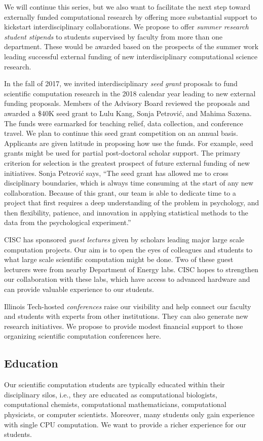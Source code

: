 \documentclass[12pt]{amsart}
\begin{document}
We will continue this series, but we also want to facilitate the next step toward externally funded computational research by offering more substantial support to kickstart interdisciplinary collaborations.  We propose to offer \emph{summer research student stipends} to students supervised by faculty from more than one department.  These would be awarded based on the prospects of the summer work leading successful external funding of new interdisciplinary computational science research. 

In the fall of 2017, we invited interdisciplinary \emph{seed grant} proposals to fund scientific computation research in the 2018 calendar year leading to new external funding proposals.  Members of the Advisory Board reviewed the proposals and awarded a \$40K seed grant to Lulu Kang, Sonja Petrovi\'c, and Mahima Saxena. The funds were earmarked for teaching relief, data collection, and conference travel.  We plan to continue this seed grant competition on an annual basis.  Applicants are given latitude in proposing how use the funds.  For example, seed grants might be used for partial post-doctoral scholar support.  The primary criterion for selection is the greatest prospect of future external funding of new initiatives. Sonja Petrovi\'c says, ``The seed grant has allowed me to cross disciplinary boundaries, which is always time consuming at the start of any new collaboration.  Because of this grant, our team is able to dedicate time to a project that first requires a deep understanding of the problem in psychology, and then flexibility, patience, and innovation in applying statistical methods to the data from the psychological experiment.''

CISC has sponsored \emph{guest lectures} given by scholars leading major large scale computation projects. Our aim is to open the eyes of colleagues and students to what large scale scientific computation might be done.  Two of these guest lecturers were from nearby Department of Energy labs.  CISC hopes to strengthen our collaboration with these labs, which have access to advanced hardware and can provide valuable experience to our students.

Illinois Tech-hosted \emph{conferences} raise our visibility and help connect our faculty and students with experts from other institutions.  They can also generate new research initiatives.  We propose to provide modest financial support to those organizing scientific computation conferences here.


\subsection*{Education} Our scientific computation students are typically educated within their disciplinary silos, i.e., they are educated as computational biologists, computational chemists, computational mathematicians, computational physicists, or computer scientists.  Moreover, many students only gain experience with single CPU computation. We want to provide a richer experience for our students.
\end{document}
